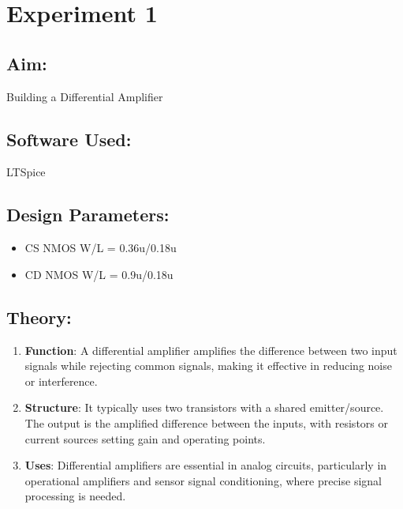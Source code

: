 \documentclass[a4paper,12pt]{report}
\begin{document}
\newpage

\tableofcontents
\newpage


\section{Experiment 1}

  \subsection{Aim:}
    \hspace{20pt}Building a Differential Amplifier

  \vspace{0.3cm} %

  \subsection{Software Used:} 
    \hspace{20pt}LTSpice

  \vspace{0.3cm}

  \subsection{Design Parameters:}
    \begin{itemize}
        \item CS NMOS W/L = 0.36u/0.18u
        \item CD NMOS W/L = 0.9u/0.18u
    \end{itemize}

  \vspace{0.3cm}

  \subsection{Theory:} 
    \begin{enumerate}
        \item \textbf{Function}: A differential amplifier amplifies the difference between two input signals while rejecting common signals, making it effective in reducing noise or interference.

        \item \textbf{Structure}: It typically uses two transistors with a shared emitter/source. The output is the amplified difference between the inputs, with resistors or current sources setting gain and operating points.

        \item \textbf{Uses}: Differential amplifiers are essential in analog circuits, particularly in operational amplifiers and sensor signal conditioning, where precise signal processing is needed.

    \end{enumerate}
\end{document}
